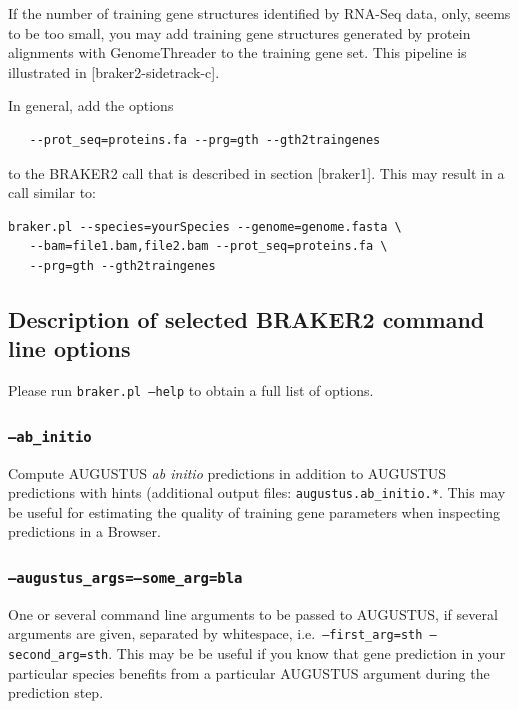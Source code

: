 \documentclass[]{article}
\begin{document}
If the number of training gene structures identified by RNA-Seq data,
only, seems to be too small, you may add training gene structures
generated by protein alignments with GenomeThreader to the training gene
set. This pipeline is illustrated in {[}braker2-sidetrack-c{]}.

In general, add the options

\begin{verbatim}
   --prot_seq=proteins.fa --prg=gth --gth2traingenes
\end{verbatim}

to the BRAKER2 call that is described in section {[}braker1{]}. This may
result in a call similar to:

\begin{verbatim}
braker.pl --species=yourSpecies --genome=genome.fasta \
   --bam=file1.bam,file2.bam --prot_seq=proteins.fa \
   --prg=gth --gth2traingenes
\end{verbatim}

\hypertarget{options}{\subsection{Description of selected BRAKER2
command line options}\label{options}}

Please run \texttt{braker.pl\ –help} to obtain a full list of options.

\hypertarget{ab_initio}{\subsubsection{\texorpdfstring{\texttt{–ab\_initio}}{--ab\_initio}}\label{ab_initio}}

Compute AUGUSTUS \emph{ab initio} predictions in addition to AUGUSTUS
predictions with hints (additional output files:
\texttt{augustus.ab\_initio.*}. This may be useful for estimating the
quality of training gene parameters when inspecting predictions in a
Browser.

\hypertarget{augustus_argssome_argbla}{\subsubsection{\texorpdfstring{\texttt{–augustus\_args=–some\_arg=bla}}{--augustus\_args=--some\_arg=bla}}\label{augustus_argssome_argbla}}

One or several command line arguments to be passed to AUGUSTUS, if
several arguments are given, separated by whitespace,
i.e.~\texttt{–first\_arg=sth\ –second\_arg=sth}. This may be be useful
if you know that gene prediction in your particular species benefits
from a particular AUGUSTUS argument during the prediction step.
\end{document}
